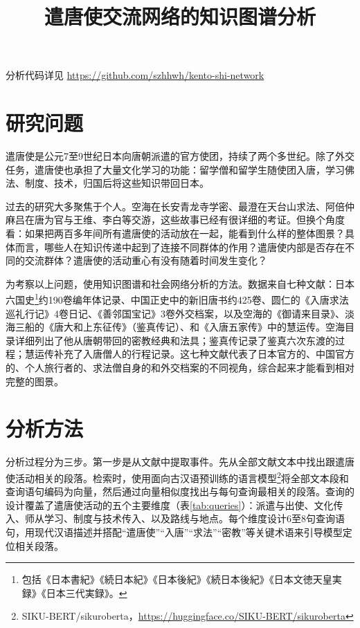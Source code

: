 \documentclass[12pt,a4paper]{article}
\title{\textbf{遣唐使交流网络的知识图谱分析}}
\author{}
\date{}
\begin{document}
\maketitle

\vspace{-1.5em}
\begin{center}
\small 分析代码详见 \url{https://github.com/szhhwh/kento-shi-network}
\end{center}

\section{研究问题}

遣唐使是公元7至9世纪日本向唐朝派遣的官方使团，持续了两个多世纪。除了外交任务，遣唐使也承担了大量文化学习的功能：留学僧和留学生随使团入唐，学习佛法、制度、技术，归国后将这些知识带回日本。

过去的研究大多聚焦于个人。空海在长安青龙寺学密、最澄在天台山求法、阿倍仲麻吕在唐为官与王维、李白等交游，这些故事已经有很详细的考证。但换个角度看：如果把两百多年间所有遣唐使的活动放在一起，能看到什么样的整体图景？具体而言，哪些人在知识传递中起到了连接不同群体的作用？遣唐使内部是否存在不同的交流群体？遣唐使的活动重心有没有随着时间发生变化？

为考察以上问题，使用知识图谱和社会网络分析的方法。数据来自七种文献：日本六国史\footnote{包括《日本書紀》《続日本紀》《日本後紀》《続日本後紀》《日本文徳天皇実録》《日本三代実録》。}约190卷编年体记录、中国正史中的新旧唐书约425卷、圆仁的《入唐求法巡礼行记》4卷日记、《善邻国宝记》3卷外交档案，以及空海的《御请来目录》、淡海三船的《唐大和上东征传》（鉴真传记）、和《入唐五家传》中的慧运传。空海目录详细列出了他从唐朝带回的密教经典和法具；鉴真传记录了鉴真六次东渡的过程；慧运传补充了入唐僧人的行程记录。这七种文献代表了日本官方的、中国官方的、个人旅行者的、求法僧自身的和外交档案的不同视角，综合起来才能看到相对完整的图景。

\section{分析方法}

分析过程分为三步。第一步是从文献中提取事件。先从全部文献文本中找出跟遣唐使活动相关的段落。检索时，使用面向古汉语预训练的语言模型\footnote{SIKU-BERT/sikuroberta，\url{https://huggingface.co/SIKU-BERT/sikuroberta}}将全部文本段和查询语句编码为向量，然后通过向量相似度找出与每句查询最相关的段落。查询的设计覆盖了遣唐使活动的五个主要维度（表\ref{tab:queries}）：派遣与出使、文化传入、师从学习、制度与技术传入、以及路线与地点。每个维度设计6至8句查询语句，用现代汉语描述并搭配“遣唐使”“入唐”“求法”“密教”等关键术语来引导模型定位相关段落。
\end{document}
